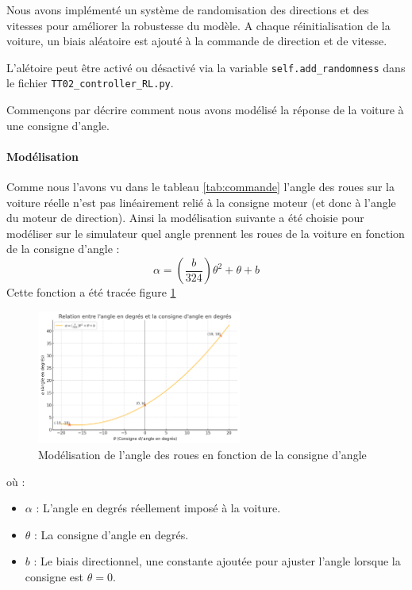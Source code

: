 \documentclass[french]{article}
\begin{document}
\label{subsec:random}

Nous avons implémenté un système de randomisation des directions et des vitesses pour améliorer la robustesse du modèle. A chaque réinitialisation de la voiture, un biais aléatoire est ajouté à la commande de direction et de vitesse. 

L'alétoire peut être activé ou désactivé via la variable \verb|self.add_randomness| dans le fichier \verb|TT02_controller_RL.py|.


Commençons par décrire comment nous avons modélisé la réponse de la voiture à une consigne d'angle.

\vspace{0.5cm}

\paragraph{Modélisation}

Comme nous l'avons vu dans le tableau \ref{tab:commande} l'angle des roues sur la voiture réelle n'est pas linéairement relié à la consigne moteur (et donc à l'angle du moteur de direction). Ainsi la modélisation suivante a été choisie pour modéliser sur le simulateur quel angle prennent les roues de la voiture en fonction de la consigne d'angle :
\begin{equation}
    \alpha = \left(\frac{b}{324}\right) \theta^2 + \theta + b
\end{equation}
Cette fonction a été tracée figure \ref{fig:angle_com}

\begin{figure}[H]
    \centering
    \includegraphics[width=0.6\textwidth]{Images/angle_com.png}
    \caption{Modélisation de l'angle des roues en fonction de la consigne d'angle}
    \label{fig:angle_com}
\end{figure}

\bigskip

où :
\begin{itemize}
    \item \(\alpha\) : L'angle en degrés réellement imposé à la voiture.
    \item \(\theta\) : La consigne d'angle en degrés.
    \item \(b\) : Le biais directionnel, une constante ajoutée pour ajuster l'angle lorsque la consigne est $\theta = 0$.
\end{itemize}
\end{document}
